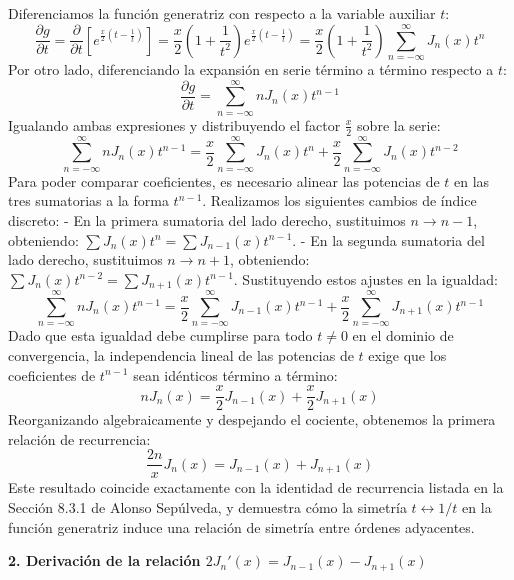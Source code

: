 \documentclass[a4paper]{article}
\begin{document}
Diferenciamos la función generatriz con respecto a la variable auxiliar $t$:
$$\frac{\partial g}{\partial t} = \frac{\partial}{\partial t} \left[ e^{\frac{x}{2}\left(t - \frac{1}{t}\right)} \right] = \frac{x}{2}\left(1 + \frac{1}{t^2}\right) e^{\frac{x}{2}\left(t - \frac{1}{t}\right)} = \frac{x}{2}\left(1 + \frac{1}{t^2}\right) \sum_{n=-\infty}^{\infty} J_n(x) t^n$$
Por otro lado, diferenciando la expansión en serie término a término respecto a $t$:
$$\frac{\partial g}{\partial t} = \sum_{n=-\infty}^{\infty} n J_n(x) t^{n-1}$$
Igualando ambas expresiones y distribuyendo el factor $\frac{x}{2}$ sobre la serie:
$$\sum_{n=-\infty}^{\infty} n J_n(x) t^{n-1} = \frac{x}{2} \sum_{n=-\infty}^{\infty} J_n(x) t^n + \frac{x}{2} \sum_{n=-\infty}^{\infty} J_n(x) t^{n-2}$$
Para poder comparar coeficientes, es necesario alinear las potencias de $t$ en las tres sumatorias a la forma $t^{n-1}$. Realizamos los siguientes cambios de índice discreto:
- En la primera sumatoria del lado derecho, sustituimos $n \to n-1$, obteniendo: $\sum J_n(x) t^n = \sum J_{n-1}(x) t^{n-1}$.
- En la segunda sumatoria del lado derecho, sustituimos $n \to n+1$, obteniendo: $\sum J_n(x) t^{n-2} = \sum J_{n+1}(x) t^{n-1}$.
Sustituyendo estos ajustes en la igualdad:
$$\sum_{n=-\infty}^{\infty} n J_n(x) t^{n-1} = \frac{x}{2} \sum_{n=-\infty}^{\infty} J_{n-1}(x) t^{n-1} + \frac{x}{2} \sum_{n=-\infty}^{\infty} J_{n+1}(x) t^{n-1}$$
Dado que esta igualdad debe cumplirse para todo $t \neq 0$ en el dominio de convergencia, la independencia lineal de las potencias de $t$ exige que los coeficientes de $t^{n-1}$ sean idénticos término a término:
$$n J_n(x) = \frac{x}{2} J_{n-1}(x) + \frac{x}{2} J_{n+1}(x)$$
Reorganizando algebraicamente y despejando el cociente, obtenemos la primera relación de recurrencia:
$$\frac{2n}{x} J_n(x) = J_{n-1}(x) + J_{n+1}(x)$$
Este resultado coincide exactamente con la identidad de recurrencia listada en la Sección 8.3.1 de Alonso Sepúlveda, y demuestra cómo la simetría $t \leftrightarrow 1/t$ en la función generatriz induce una relación de simetría entre órdenes adyacentes.

\textbf{2. Derivación de la relación $2J_n'(x) = J_{n-1}(x) - J_{n+1}(x)$}
\end{document}

